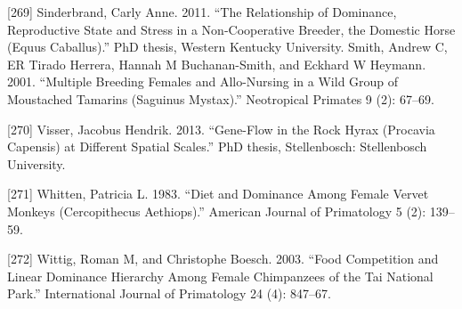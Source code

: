 \documentclass[
]{article}
\begin{document}
{[}269{]} Sinderbrand, Carly Anne. 2011. ``The Relationship of
Dominance, Reproductive State and Stress in a Non-Cooperative Breeder,
the Domestic Horse (Equus Caballus).'' PhD thesis, Western Kentucky
University. Smith, Andrew C, ER Tirado Herrera, Hannah M Buchanan-Smith,
and Eckhard W Heymann. 2001. ``Multiple Breeding Females and
Allo-Nursing in a Wild Group of Moustached Tamarins (Saguinus Mystax).''
Neotropical Primates 9 (2): 67--69.

{[}270{]} Visser, Jacobus Hendrik. 2013. ``Gene-Flow in the Rock Hyrax
(Procavia Capensis) at Different Spatial Scales.'' PhD thesis,
Stellenbosch: Stellenbosch University.

{[}271{]} Whitten, Patricia L. 1983. ``Diet and Dominance Among Female
Vervet Monkeys (Cercopithecus Aethiops).'' American Journal of
Primatology 5 (2): 139--59.

{[}272{]} Wittig, Roman M, and Christophe Boesch. 2003. ``Food
Competition and Linear Dominance Hierarchy Among Female Chimpanzees of
the Tai National Park.'' International Journal of Primatology 24 (4):
847--67.
\end{document}
